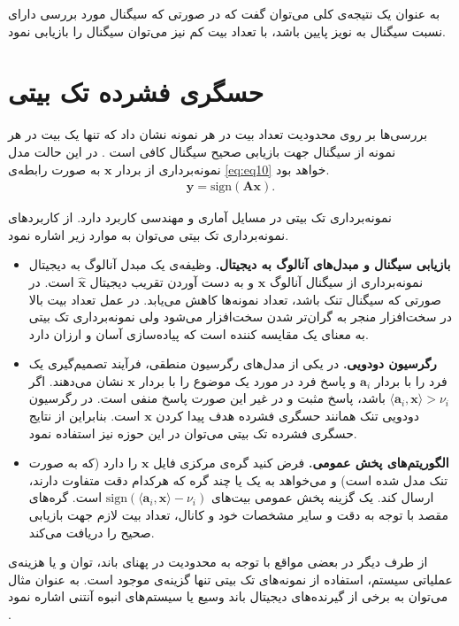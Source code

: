 به عنوان یک نتیجه‌ی کلی می‌توان گفت که در صورتی که سیگنال مورد بررسی دارای نسبت سیگنال به نویز پایین باشد، با تعداد بیت کم نیز می‌توان سیگنال را بازیابی نمود.
\section{حسگری فشرده تک بیتی}
بررسی‌ها بر روی محدودیت تعداد بیت در هر نمونه نشان داد که تنها یک بیت در هر نمونه از سیگنال جهت بازیابی صحیح سیگنال کافی است
\cite{boufounos20081} .
در این حالت مدل نمونه‌برداری از بردار 
$\bm{x}$
به صورت رابطه‌ی 
\eqref{eq:eq10}
خواهد بود.
\begin{align}
\label{eq:eq10}
\bm{y}= \text{sign}\left(\bm{A}\bm{x}\right).
\end{align}


نمونه‌برداری تک بیتی در  مسایل آماری و مهندسی کاربرد دارد. از کاربرد‌های نمونه‌برداری تک بیتی ‌می‌توان به موارد زیر اشاره نمود.
\begin{itemize}
\item{
\textbf{
بازیابی سیگنال و مبدل‌های آنالوگ به دیجیتال.
}
وظیفه‌ی یک مبدل آنالوگ به دیجیتال نمونه‌برداری از سیگنال آنالوگ
$ \bm{x} $
و به دست آوردن تقریب دیجیتال
$ \widehat{\bm{x}}$
است. در صورتی که سیگنال تنک باشد، تعداد نمونه‌ها کاهش می‌یابد. در عمل تعداد بیت بالا در سخت‌افزار منجر به گران‌تر شدن سخت‌افزار می‌شود ولی نمونه‌برداری تک بیتی به معنای یک مقایسه کننده است که پیاده‌سازی آسان و ارزان دارد. 
}
\item{
\textbf{
رگرسیون دودویی.
}
در یکی از مدل‌های رگرسیون منطقی، فرآیند تصمیم‌گیری یک فرد را با بردار
$ \bm{a}_{i} $
و پاسخ فرد در مورد یک موضوع را با بردار
$ \bm{x} $
نشان می‌دهند. اگر 
$ \langle \bm{a}_{i}  , \bm{x}\rangle > \nu_{i} $
باشد، پاسخ مثبت و در غیر این صورت پاسخ منفی است. در رگرسیون دودویی تنک همانند حسگری فشرده هدف پیدا کردن 
$ \bm{x} $
است. بنابراین از نتایج حسگری فشرده تک بیتی می‌توان در این حوزه نیز استفاده نمود.
}
\item{
\textbf{
الگوریتم‌های پخش عمومی.
}
فرض کنید گره‌ی مرکزی
فایل 
$ \bm{x} $
را دارد (که به صورت تنک مدل شده است) و می‌خواهد به یک یا چند گره که هرکدام  دقت متفاوت دارند، ارسال کند. یک گزینه پخش عمومی بیت‌های
$ \text{sign}\left( \langle \bm{a}_{i}  , \bm{x}\rangle - \nu_{i}  \right) $
است. گره‌های مقصد با توجه به دقت و سایر مشخصات خود و کانال، تعداد بیت لازم جهت بازیابی صحیح را دریافت می‌کند.
}
\end{itemize}

از طرف دیگر در بعضی مواقع با توجه به محدودیت در پهنای باند، توان و یا هزینه‌ی عملیاتی سیستم، استفاده از نمونه‌های تک بیتی تنها گزینه‌ی موجود است. به عنوان مثال می‌توان به برخی از گیرنده‌های دیجیتال باند وسیع یا سیستم‌های انبوه آنتنی
اشاره نمود
\cite{Yin2010,risi2014massive,jacques2013robust, baraniuk2017exponential}.


